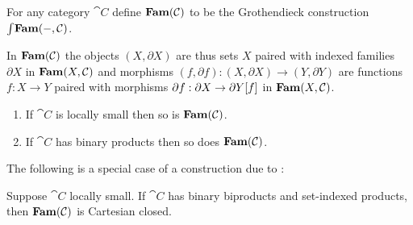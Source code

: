 \begin{definition}
For any category $\cat{C}$ define $\mathbf{Fam}(\mathcal{C})$ to be the Grothendieck construction
$\int_{}\mathbf{Fam}(-,\mathcal{C})$.
\end{definition}

\noindent In $\mathbf{Fam}(\mathcal{C})$ the objects $(X, \partial X)$ are thus sets $X$ paired with indexed families
$\partial X$ in $\mathbf{Fam}(X,\mathcal{C})$ and morphisms $(f, \partial f): (X, \partial X) \to (Y, \partial Y)$ are
functions $f: X \to Y$ paired with morphisms $\partial f: \partial X \to \partial Y[f]$ in
$\mathbf{Fam}(X,\mathcal{C})$.

\begin{proposition}
\item
\begin{enumerate}
\item If $\cat{C}$ is locally small then so is $\mathbf{Fam}(\mathcal{C})$.
\item If $\cat{C}$ has binary products then so does $\mathbf{Fam}(\mathcal{C})$.
\end{enumerate}
\end{proposition}

The following is a special case of a construction due to \citet{nunes2023}:

\begin{proposition}
Suppose $\cat{C}$ locally small. If $\cat{C}$ has binary biproducts and set-indexed products, then
$\mathbf{Fam}(\mathcal{C})$ is Cartesian closed.
\end{proposition}

